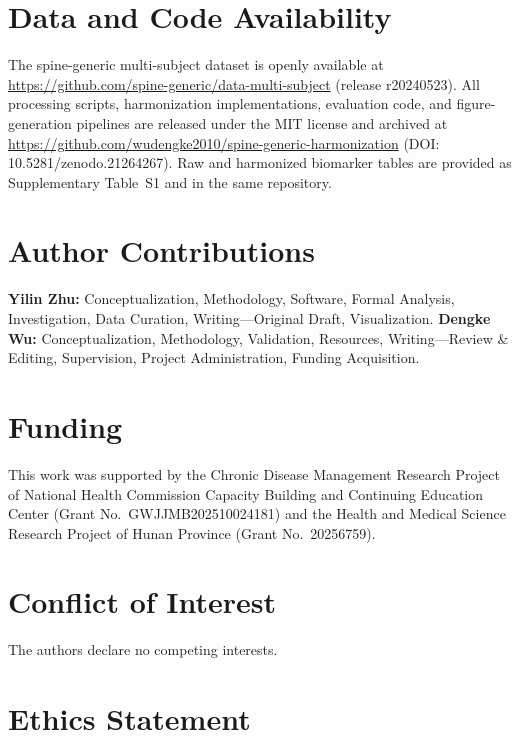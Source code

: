 \documentclass[12pt,a4paper]{article}
\begin{document}
\section*{Data and Code Availability}

The spine-generic multi-subject dataset is openly available at \url{https://github.com/spine-generic/data-multi-subject} (release r20240523). All processing scripts, harmonization implementations, evaluation code, and figure-generation pipelines are released under the MIT license and archived at \url{https://github.com/wudengke2010/spine-generic-harmonization} (DOI: 10.5281/zenodo.21264267). Raw and harmonized biomarker tables are provided as Supplementary Table~S1 and in the same repository.

\section*{Author Contributions}

\textbf{Yilin Zhu:} Conceptualization, Methodology, Software, Formal Analysis, Investigation, Data Curation, Writing---Original Draft, Visualization. \textbf{Dengke Wu:} Conceptualization, Methodology, Validation, Resources, Writing---Review \& Editing, Supervision, Project Administration, Funding Acquisition.

\section*{Funding}

This work was supported by the Chronic Disease Management Research Project of National Health Commission Capacity Building and Continuing Education Center (Grant No.~GWJJMB202510024181) and the Health and Medical Science Research Project of Hunan Province (Grant No.~20256759).

\section*{Conflict of Interest}

The authors declare no competing interests.

\section*{Ethics Statement}
\end{document}
